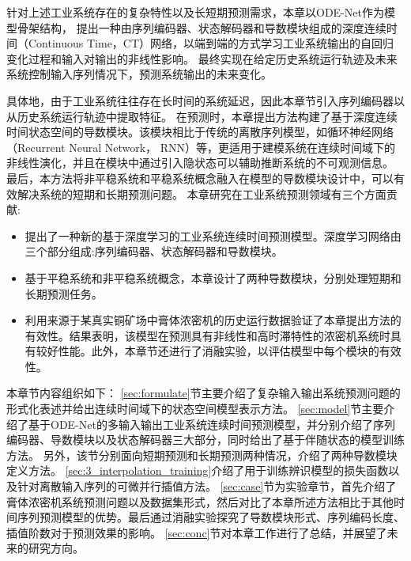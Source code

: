 针对上述工业系统存在的复杂特性以及长短期预测需求，本章以ODE-Net作为模型骨架结构，
提出一种由序列编码器、状态解码器和导数模块组成的深度连续时间（Continuous Time，CT）网络，以端到端的方式学习工业系统输出的自回归变化过程和输入对输出的非线性影响。
最终实现在给定历史系统运行轨迹及未来系统控制输入序列情况下，预测系统输出的未来变化。

具体地，由于工业系统往往存在长时间的系统延迟，因此本章节引入序列编码器以从历史系统运行轨迹中提取特征。
在预测时，本章提出方法构建了基于深度连续时间状态空间的导数模块。该模块相比于传统的离散序列模型，如循环神经网络（Recurrent Neural Network， RNN）等，更适用于建模系统在连续时间域下的非线性演化，并且在模块中通过引入隐状态可以辅助推断系统的不可观测信息。
最后，本方法将非平稳系统和平稳系统概念融入在模型的导数模块设计中，可以有效解决系统的短期和长期预测问题。
本章研究在工业系统预测领域有三个方面贡献:
\begin{itemize}
\item 提出了一种新的基于深度学习的工业系统连续时间预测模型。深度学习网络由三个部分组成:序列编码器、状态解码器和导数模块。
\item 基于平稳系统和非平稳系统概念，本章设计了两种导数模块，分别处理短期和长期预测任务。
\item 利用来源于某真实铜矿场中膏体浓密机的历史运行数据验证了本章提出方法的有效性。结果表明，该模型在预测具有非线性和高时滞特性的浓密机系统时具有较好性能。此外，本章节还进行了消融实验，以评估模型中每个模块的有效性。
\end{itemize}

本章节内容组织如下：
\ref{sec:formulate}节主要介绍了复杂输入输出系统预测问题的形式化表述并给出连续时间域下的状态空间模型表示方法。
\ref{sec:model}节主要介绍了基于ODE-Net的多输入输出工业系统连续时间预测模型，并分别介绍了序列编码器、导数模块以及状态解码器三大部分，同时给出了基于伴随状态的模型训练方法。
另外，该节分别面向短期预测和长期预测两种情况，介绍了两种导数模块定义方法。
\ref{sec:3_interpolation_training}介绍了用于训练辨识模型的损失函数以及针对离散输入序列的可微并行插值方法。
\ref{sec:case}节为实验章节，首先介绍了膏体浓密机系统预测问题以及数据集形式，然后对比了本章所述方法相比于其他时间序列预测模型的优势。最后通过消融实验探究了导数模块形式、序列编码长度、插值阶数对于预测效果的影响。
\ref{sec:conc}节对本章工作进行了总结，并展望了未来的研究方向。

